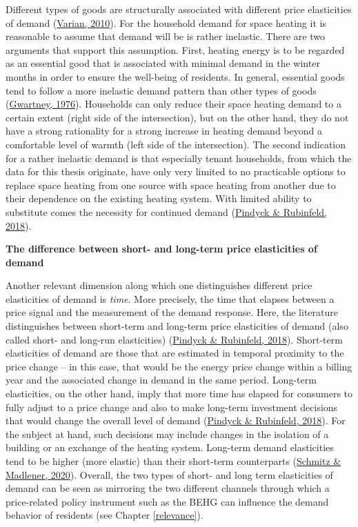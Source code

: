 \documentclass[12pt,twoside]{reedthesis}
\begin{document}
Different types of goods are structurally associated with different price elasticities of demand (\protect\hyperlink{ref-varian10}{Varian, 2010}). For the household demand for space heating it is reasonable to assume that demand will be is rather inelastic. There are two arguments that support this assumption. First, heating energy is to be regarded as an essential good that is associated with minimal demand in the winter months in order to ensure the well-being of residents. In general, essential goods tend to follow a more inelastic demand pattern than other types of goods (\protect\hyperlink{ref-gwartney76}{Gwartney, 1976}). Households can only reduce their space heating demand to a certain extent (right side of the intersection), but on the other hand, they do not have a strong rationality for a strong increase in heating demand beyond a comfortable level of warmth (left side of the intersection). The second indication for a rather inelastic demand is that especially tenant households, from which the data for this thesis originate, have only very limited to no practicable options to replace space heating from one source with space heating from another due to their dependence on the existing heating system. With limited ability to substitute comes the necessity for continued demand (\protect\hyperlink{ref-pindyck_rubinfeld18}{Pindyck \& Rubinfeld, 2018}).

\textbf{The difference between short- and long-term price elasticities of demand}

Another relevant dimension along which one distinguishes different price elasticities of demand is \emph{time}. More precisely, the time that elapses between a price signal and the measurement of the demand response. Here, the literature distinguishes between short-term and long-term price elasticities of demand (also called short- and long-run elasticities) (\protect\hyperlink{ref-pindyck_rubinfeld18}{Pindyck \& Rubinfeld, 2018}). Short-term elasticities of demand are those that are estimated in temporal proximity to the price change -- in this case, that would be the energy price change within a billing year and the associated change in demand in the same period. Long-term elasticities, on the other hand, imply that more time has elapsed for consumers to fully adjust to a price change and also to make long-term investment decisions that would change the overall level of demand (\protect\hyperlink{ref-pindyck_rubinfeld18}{Pindyck \& Rubinfeld, 2018}). For the subject at hand, such decisions may include changes in the isolation of a building or an exchange of the heating system. Long-term demand elasticities tend to be higher (more elastic) than their short-term counterparts (\protect\hyperlink{ref-schmitz_madlener20}{Schmitz \& Madlener, 2020}). Overall, the two types of short- and long term elasticities of demand can be seen as mirroring the two different channels through which a price-related policy instrument such as the BEHG can influence the demand behavior of residents (see Chapter \ref{relevance}).
\end{document}

